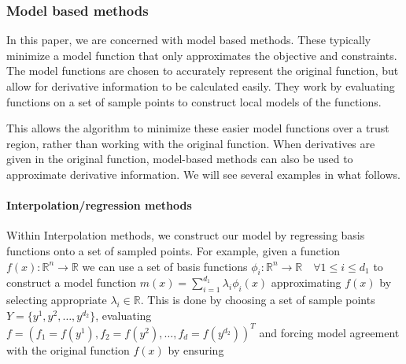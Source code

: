 \documentclass{article}
\begin{document}
\subsubsection{Model based methods}

In this paper, we are concerned with model based methods.
These typically minimize a model function that only approximates the objective and constraints.
The model functions are chosen to accurately represent the original function, but allow for derivative information to be calculated easily.
They work by evaluating functions on a set of sample points to construct local models of the functions.

This allows the algorithm to minimize these easier model functions over a trust region, rather than working with the original function.
When derivatives are given in the original function, model-based methods can also be used to approximate derivative information.
We will see several examples in what follows.






\paragraph{Interpolation/regression methods}

Within Interpolation methods, we construct our model by regressing basis functions onto a set of sampled points.
For example, given a function $f(x) : \mathbb R^n \to \mathbb R$ we can use a set of basis functions $\phi_i : \mathbb R^n \to \mathbb R \quad \forall 1 \le i \le d_1$ to construct a model function $m(x) = \sum_{i=1}^{d_1} \lambda_i \phi_i(x)$ approximating $f(x)$ by selecting appropriate $\lambda_i \in \mathbb R$.
This is done by choosing a set of sample points
$Y = \{y^1, y^2, \ldots, y^{d_2}\}$,
evaluating $f = (f_1 = f(y^1), f_2 = f(y^2), \ldots, f_d = f(y^{d_2}))^T$ and forcing model agreement with the original function $f(x)$ by ensuring
\end{document}
